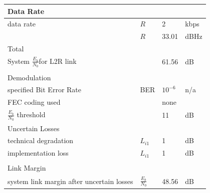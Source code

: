 \begin{table}[]
\begin{tabular}{llll}
\multicolumn{4}{l}{\cellcolor[HTML]{DAE8FC}Data Rate}                            \\ \hline
data rate                                 &${R}$   		& 2                      & kbps \\
                                          &${R}$ 		& 33.01                  & dBHz \\ \hline
\multicolumn{4}{l}{\cellcolor[HTML]{DAE8FC}Total}                                \\ \hline
System $\frac{{E}_{b}}{{N}_{0}}$for L2R link &      		& 61.56                  & dB   \\
\multicolumn{4}{l}{}                                                             \\ \hline
\multicolumn{4}{l}{\cellcolor[HTML]{DAE8FC}Demodulation}                         \\ \hline
specified Bit Error Rate                  &BER      		& $10^{-6}$ 			  & n/a  \\
FEC coding used                           &      		& none                   &      \\
$\frac{{E}_{b}}{{N}_{0}}$ threshold       &				& 11                     & dB   \\ \hline
\multicolumn{4}{l}{\cellcolor[HTML]{DAE8FC}Uncertain Losses}                     \\ \hline
technical degradation                     &${L}_{i1}$	& 1                      & dB   \\
implementation loss                       &${L}_{i1}$	& 1                      & dB   \\
\multicolumn{4}{l}{}                                                             \\ \hline
\multicolumn{4}{l}{\cellcolor[HTML]{DAE8FC}Link Margin}                          \\ \hline
system link margin after uncertain losses &$\frac{{E}_{b}}{{N}_{0}}$	& 48.56      & dB  
\end{tabular}
\end{table}

